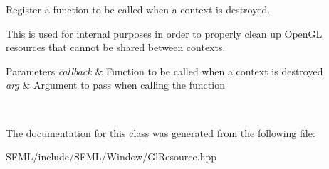 Register a function to be called when a context is destroyed. 

This is used for internal purposes in order to properly clean up Open\+GL resources that cannot be shared between contexts.


\begin{DoxyParams}{Parameters}
{\em callback} & Function to be called when a context is destroyed \\
\hline
{\em arg} & Argument to pass when calling the function \begin{DoxyVerb}\end{DoxyVerb}
 \\
\hline
\end{DoxyParams}


The documentation for this class was generated from the following file\+:\begin{DoxyCompactItemize}
\item 
S\+F\+M\+L/include/\+S\+F\+M\+L/\+Window/Gl\+Resource.\+hpp\end{DoxyCompactItemize}

